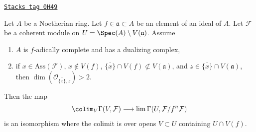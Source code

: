 \begin{proposition}
\label{algebraization-proposition-alternative-colim-H0}
\href{https://stacks.math.columbia.edu/tag/0H49}{\texttt{Stacks tag 0H49}}

Let $A$ be a Noetherian ring. Let $f \in \mathfrak a \subset A$
be an element of an ideal of $A$. Let $\mathcal{F}$ be a coherent
module on $U = \Spec(A) \setminus V(\mathfrak a)$. Assume
\begin{enumerate}
\item $A$ is $f$-adically complete and has a dualizing complex,
\item if $x \in \text{Ass}(\mathcal{F})$, $x \not \in V(f)$,
$\overline{\{x\}} \cap V(f) \not \subset V(\mathfrak a)$,
and $z \in \overline{\{x\}} \cap V(\mathfrak a)$, then
$\dim(\mathcal{O}_{\overline{\{x\}}, z}) > 2$.
\end{enumerate}
Then the map
$$
\colim_V \Gamma(V, \mathcal{F})
\longrightarrow
\lim \Gamma(U, \mathcal{F}/f^n\mathcal{F})
$$
is an isomorphism where the colimit is over opens $V \subset U$
containing $U \cap V(f)$.
\end{proposition}

